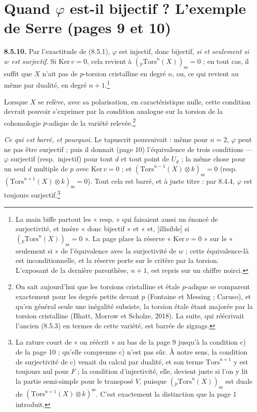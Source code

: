 \documentclass[11pt,a4paper]{article}
\begin{document}
\section*{Quand $\varphi$ est-il bijectif ? L'exemple de Serre (pages 9 et 10)}

\textbf{8.5.10.} Par l'exactitude de (8.5.1), $\varphi$ est injectif, donc
bijectif, \emph{si et seulement si $w$ est surjectif}. Si $\mathrm{Ker}\, v =
0$, cela revient à $({}_{p}\mathrm{Tors}^{n}(X))_{\mathrm{ss}} = 0$ ; en tout
cas, il suffit que $X$ n'ait pas de $p$-torsion cristalline en degré $n$, ou,
ce qui revient au même par dualité, en degré $n + 1$.\footnote{La main biffe
partout les « resp. » qui faisaient aussi un énoncé de surjectivité, et
insère « donc bijectif » et « et, [illisible] si
$({}_{p}\mathrm{Tors}^{n}(X))_{\mathrm{ss}} = 0$ ». La page place la réserve
« $\mathrm{Ker}\, v = 0$ » sur le « seulement si » de l'équivalence avec la
surjectivité de $w$ ; cette équivalence-là est inconditionnelle, et la
réserve porte sur le critère par la torsion. L'exposant de la dernière
parenthèse, $n + 1$, est repris sur un chiffre noirci.}

Lorsque $X$ se relève, avec sa polarisation, en caractéristique nulle, cette
condition devrait pouvoir s'exprimer par la condition analogue sur la torsion
de la cohomologie $p$-adique de la variété relevée.\footnote{On sait
aujourd'hui que les torsions cristalline et étale $p$-adique se comparent
exactement pour les degrés petits devant $p$ (Fontaine et Messing ;
Caruso), et qu'en général seule une inégalité subsiste, la torsion étale
étant majorée par la torsion cristalline (Bhatt, Morrow et Scholze, 2018). La
suite, qui réécrivait l'ancien (8.5.3) en termes de cette variété, est barrée
de zigzags.}

\emph{Ce qui est barré, et pourquoi.} Le tapuscrit poursuivait : même pour
$n = 2$, $\varphi$ peut ne pas être surjectif ; puis il donnait (page 10)
l'équivalence de trois conditions --- $\varphi$ surjectif (resp.\ injectif)
pour tout $d$ et tout point de $U_{d}$ ; la même chose pour un seul $d$
multiple de $p$ avec $\mathrm{Ker}\, v = 0$ ; et
$(\mathrm{Tors}^{n-1}(X) \otimes k)_{\mathrm{ss}} = 0$ (resp.\
$(\mathrm{Tors}^{n+1}(X) \otimes k)_{\mathrm{ss}} = 0$). Tout cela est barré,
et à juste titre : par 8.4.4, $\varphi$ est toujours
surjectif.\footnote{La rature court de « on réécrit » au bas de la page 9
jusqu'à la condition c) de la page 10 ; qu'elle comprenne c) n'est pas sûr.
À notre sens, la condition de surjectivité de c) venait du calcul par
dualité, et son terme $\mathrm{Tors}^{n+1}$ y est toujours nul pour $F$ ; la
condition d'injectivité, elle, devient juste si l'on y lit la partie
semi-simple pour le transposé $V$, puisque
$({}_{p}\mathrm{Tors}^{n}(X))_{\mathrm{ss}}$ est duale de
$(\mathrm{Tors}^{n+1}(X) \otimes k)^{\mathrm{ss}}$. C'est exactement la
distinction que la page 1 introduit.}
\end{document}
